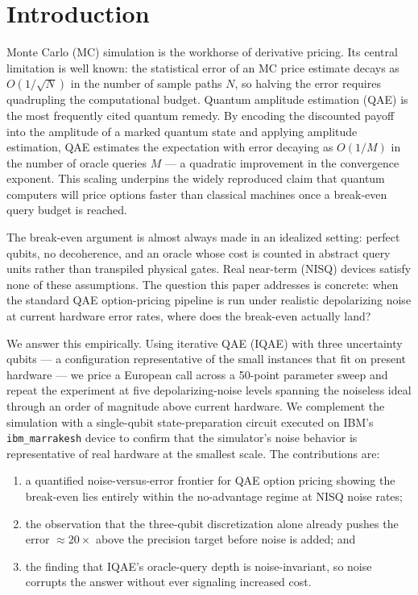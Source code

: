 \documentclass[runningheads]{llncs}
\begin{document}
\section{Introduction}
Monte Carlo (MC) simulation is the workhorse of derivative pricing. Its central
limitation is well known: the statistical error of an MC price estimate decays
as $O(1/\sqrt{N})$ in the number of sample paths $N$, so halving the error
requires quadrupling the computational budget. Quantum amplitude estimation
(QAE) is the most frequently cited quantum remedy. By encoding the discounted
payoff into the amplitude of a marked quantum state and applying amplitude
estimation, QAE estimates the expectation with error decaying as $O(1/M)$ in the
number of oracle queries $M$ --- a quadratic improvement in the convergence
exponent. This scaling underpins the widely reproduced claim that quantum
computers will price options faster than classical machines once a break-even
query budget is reached.

The break-even argument is almost always made in an idealized setting: perfect
qubits, no decoherence, and an oracle whose cost is counted in abstract query
units rather than transpiled physical gates. Real near-term (NISQ) devices
satisfy none of these assumptions. The question this paper addresses is
concrete: when the standard QAE option-pricing pipeline is run under realistic
depolarizing noise at current hardware error rates, where does the break-even
actually land?

We answer this empirically. Using iterative QAE (IQAE) with three uncertainty
qubits --- a configuration representative of the small instances that fit on
present hardware --- we price a European call across a 50-point parameter sweep
and repeat the experiment at five depolarizing-noise levels spanning the
noiseless ideal through an order of magnitude above current hardware. We
complement the simulation with a single-qubit state-preparation circuit executed
on IBM's \texttt{ibm\_marrakesh} device to confirm that the simulator's noise
behavior is representative of real hardware at the smallest scale. The
contributions are:
\begin{enumerate}
\item a quantified noise-versus-error frontier for QAE option pricing showing
the break-even lies entirely within the no-advantage regime at NISQ noise rates;
\item the observation that the three-qubit discretization alone already pushes
the error ${\approx}20\times$ above the precision target before noise is added;
and
\item the finding that IQAE's oracle-query depth is noise-invariant, so noise
corrupts the answer without ever signaling increased cost.
\end{enumerate}
\end{document}
